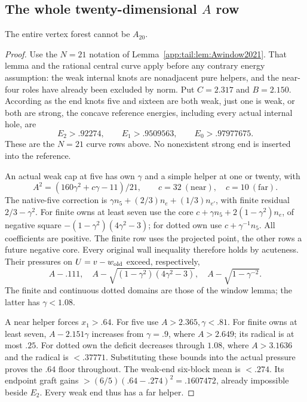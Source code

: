 \subsection{The whole twenty-dimensional $A$ row}
\begin{lemma}\label{app:tail:lem:wholeA20}
The entire vertex forest cannot be $A_{20}$.
\end{lemma}
\begin{proof}
Use the $N=21$ notation of Lemma~\ref{app:tail:lem:Awindow2021}.
That lemma and the rational central curve apply before any contrary
energy assumption: the weak internal knots are nonadjacent pure
helpers, and the near-four roles have already been excluded by norm.
Put $C=2.317$ and $B=2.150$. According as the end knots five and
sixteen are both weak, just one is weak, or both are strong, the
concave reference energies, including every actual internal hole, are
\[
 E_2>.92274,\qquad E_1>.9509563,\qquad E_0>.97977675.
\]
These are the $N=21$ curve rows above. No nonexistent strong end
is inserted into the reference.

An actual weak cap at five has own $\gamma$ and a simple helper
at one or twenty, with
\[
 A^2=(160\gamma^2+c\gamma-11)/21,
 \qquad c=32\ (\text{near}),\quad c=10\ (\text{far}).
\]
The native-five correction is
$\gamma n_5+(2/3)n_e+(1/3)n_{e'}$, with finite residual
$2/3-\gamma^2$. For finite owns at least seven use the core
$c+\gamma n_5+2(1-\gamma^2)n_e$, of negative square
$-(1-\gamma^2)(4\gamma^2-3)$; for dotted own use
$c+\gamma^{-1}n_5$. All coefficients are positive.
The finite row uses the projected point, the other rows a future
negative core. Every original wall inequality therefore holds by
acuteness. Their pressures on $U=v-w_{\rm old}$ exceed, respectively,
\[
 A-.111,\quad A-\sqrt{(1-\gamma^2)(4\gamma^2-3)},\quad
 A-\sqrt{1-\gamma^{-2}}.
\]
The finite and continuous dotted domains are those of the window
lemma; the latter has $\gamma<1.08$.

A near helper forces $x_1>.64$. For five use $A>2.365,\gamma<.81$.
For finite owns at least seven, $A-2.151\gamma$ increases from
$\gamma=.9$, where $A>2.649$; its radical is at most $.25$.
For dotted own the deficit decreases through $1.08$, where
$A>3.1636$ and the radical is $<.37771$.
Substituting these bounds into the actual pressure proves the
$.64$ floor throughout. The weak-end six-block mean is $<.274$.
Its endpoint graft gains $>(6/5)(.64-.274)^2=.1607472$, already
impossible beside $E_2$. Every weak end thus has a far helper.


\end{proof}
